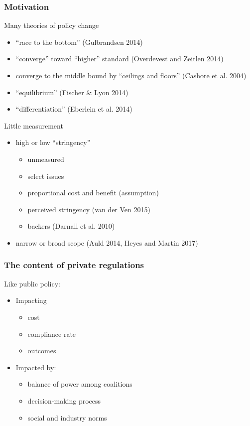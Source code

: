 \begin{frame}
\frametitle{Motivation}
Many theories of policy change
\begin{itemize}
\item ``race to the bottom'' (Gulbrandsen 2014)
\item ``converge'' toward ``higher'' standard (Overdevest and Zeitlen 2014)
\item converge to the middle bound by ``ceilings and floors'' (Cashore et al. 2004)
\item ``equilibrium'' (Fischer \& Lyon 2014) 
\item ``differentiation'' (Eberlein et al. 2014)
\end{itemize}\pause
Little measurement \pause
\begin{itemize}
\item high or low ``stringency'' \begin{itemize}
	\item unmeasured
    \item select issues 
    \item proportional cost and benefit (assumption) \pause
    \item perceived stringency (van der Ven 2015)
    \item backers (Darnall et al. 2010)
\end{itemize}
\item narrow or broad scope (Auld 2014, Heyes and Martin 2017)
\end{itemize}
\end{frame}



\begin{frame}
\frametitle{The content of private regulations}
Like public policy: \begin{itemize}
  \item Impacting \begin{itemize}
    \item cost
    \item compliance rate
    \item outcomes \end{itemize} \pause
  \item Impacted by: \begin{itemize}
    \item balance of power among coalitions
    \item decision-making process 
    \item social and industry norms \end{itemize}
\end{itemize}

\end{frame}


